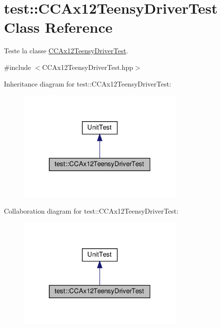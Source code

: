 \hypertarget{classtest_1_1CCAx12TeensyDriverTest}{}\section{test\+:\+:C\+C\+Ax12\+Teensy\+Driver\+Test Class Reference}
\label{classtest_1_1CCAx12TeensyDriverTest}


Teste la classe \hyperlink{classtest_1_1CCAx12TeensyDriverTest}{C\+C\+Ax12\+Teensy\+Driver\+Test}.  




{\ttfamily \#include $<$C\+C\+Ax12\+Teensy\+Driver\+Test.\+hpp$>$}



Inheritance diagram for test\+:\+:C\+C\+Ax12\+Teensy\+Driver\+Test\+:
\nopagebreak
\begin{figure}[H]
\begin{center}
\leavevmode
\includegraphics[width=235pt]{classtest_1_1CCAx12TeensyDriverTest__inherit__graph}
\end{center}
\end{figure}


Collaboration diagram for test\+:\+:C\+C\+Ax12\+Teensy\+Driver\+Test\+:
\nopagebreak
\begin{figure}[H]
\begin{center}
\leavevmode
\includegraphics[width=235pt]{classtest_1_1CCAx12TeensyDriverTest__coll__graph}
\end{center}
\end{figure}
